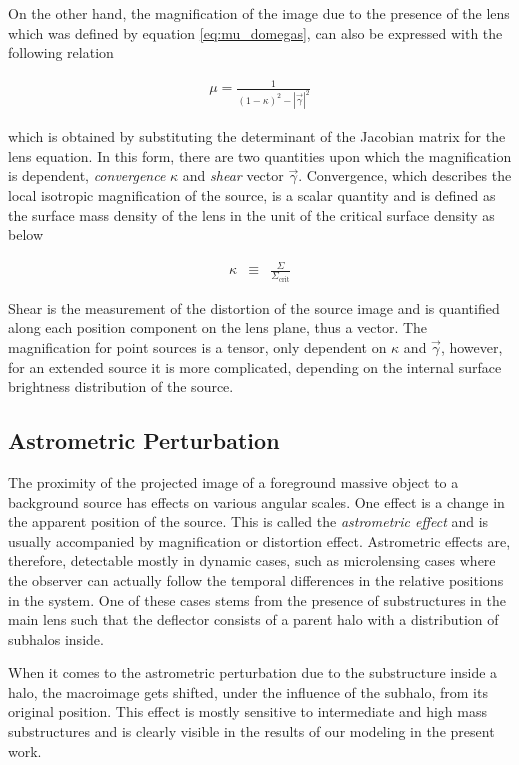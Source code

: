 \documentclass[a4wide,12pt]{book}
\begin{document}
On the other hand, the magnification of the image due to the presence of the lens which was defined by equation \ref{eq:mu_domegas}, can also be expressed with the following relation 

\begin{eqnarray}
\label{eq:mu_kappa_gamma}
\mu = \frac{1}{(1 - \kappa)^2 - |\vec{\gamma}|^2}
\end{eqnarray}

which is obtained by substituting the determinant of the Jacobian matrix for the lens equation. In this form, there are two quantities upon which the magnification is dependent, \emph{convergence} $\kappa$ and \emph{shear} vector $\vec{\gamma}$. Convergence, which describes the local isotropic magnification of the source, is a scalar quantity and is defined as the surface mass density of the lens in the unit of the critical surface density as below

\begin{eqnarray}
\label{eq:convergence}
\kappa &\equiv& \frac{\Sigma}{\Sigma_{\mathrm{crit}}}
\end{eqnarray}

 Shear is the measurement of the distortion of the source image and is quantified along each position component on the lens plane, thus a vector. The magnification for point sources is a tensor, only dependent on $\kappa$ and $\vec{\gamma}$, however, for an extended source it is more complicated, depending on the internal surface brightness distribution of the source.

\subsection{Astrometric Perturbation}
The proximity of the projected image of a foreground massive object to a background source has effects on various angular scales. One effect is a change in the apparent position of the source. This is called the \emph{astrometric effect} and is usually accompanied by magnification or distortion effect. Astrometric effects are, therefore, detectable mostly in dynamic cases, such as microlensing cases where the observer can actually follow the temporal differences in the relative positions in the system. One of these cases stems from the presence of substructures in the main lens such that the deflector consists of a parent halo with a distribution of subhalos inside. 
 
When it comes to the astrometric perturbation due to the substructure inside a halo, the macroimage gets shifted, under the influence of the subhalo, from its original position. This effect is mostly sensitive to intermediate and high mass substructures \citet{Moustakas+2009} and is clearly visible in the results of our modeling in the present work. %
 
\end{document}
